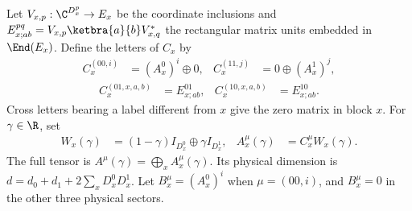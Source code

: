 \begin{definition}
    \label{def:mpo_joint_mixed_family}
    \leanok
    Let $V_{x,p}:\C^{D_x^p}\to E_x$ be the coordinate inclusions and
    $E_{x;ab}^{pq}=V_{x,p}\ketbra{a}{b}V_{x,q}^*$ the rectangular
    matrix units embedded in $\End(E_x)$. Define the letters of $C_x$ by
    \begin{align}
        C_x^{(00,i)} & =(A_x^0)^i\oplus0,
                     & C_x^{(11,j)}       & =0\oplus(A_x^1)^j,
        \label{eq:mpo_joint_mixed_diagonal}
    \end{align}
    \begin{align}
        C_x^{(01,x,a,b)} & =E_{x;ab}^{01},
                         & C_x^{(10,x,a,b)} & =E_{x;ab}^{10}.
        \label{eq:mpo_joint_mixed_cross}
    \end{align}
    Cross letters bearing a label different from $x$ give the zero
    matrix in block $x$. For $\gamma\in\R$, set
    \begin{align}
        W_x(\gamma) & =(1-\gamma)I_{D_x^0}\oplus\gamma I_{D_x^1},
                    & A_x^\mu(\gamma)                             & =C_x^\mu W_x(\gamma).
        \label{eq:mpo_joint_mixed_weight}
    \end{align}
    The full tensor is $A^\mu(\gamma)=\bigoplus_xA_x^\mu(\gamma)$.
    Its physical dimension is $d=d_0+d_1+2\sum_xD_x^0D_x^1$.
    Let $B_x^\mu=(A_x^0)^i$ when $\mu=(00,i)$, and
    $B_x^\mu=0$ in the other three physical sectors.
\end{definition}


